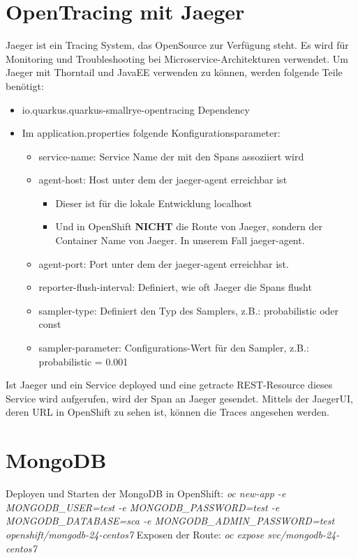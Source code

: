 \documentclass[11pt, a4paper, twoside]{article}   	%
\begin{document}
\section{OpenTracing mit Jaeger}
Jaeger ist ein Tracing System, das OpenSource zur Verfügung steht. Es wird für Monitoring und Troubleshooting bei Microservice-Architekturen verwendet.
Um Jaeger mit Thorntail und JavaEE verwenden zu können, werden folgende Teile benötigt:
\begin{itemize}
	\item io.quarkus.quarkus-smallrye-opentracing  Dependency
	\item Im application.properties folgende Konfigurationsparameter:
	\begin{itemize}
		\item service-name: Service Name der mit den Spans assoziiert wird
		\item agent-host: Host unter dem der jaeger-agent erreichbar ist
		\begin{itemize}
			\item Dieser ist für die lokale Entwicklung localhost
			\item Und in OpenShift \textbf{NICHT} die Route von Jaeger, sondern der Container Name von Jaeger. In unserem Fall jaeger-agent.
		\end{itemize}
		\item agent-port: Port unter dem der jaeger-agent erreichbar ist.
		\item reporter-flush-interval: Definiert, wie oft Jaeger die Spans flusht
		\item sampler-type: Definiert den Typ des Samplers, z.B.: probabilistic oder const
		\item sampler-parameter: Configurations-Wert für den Sampler, z.B.: probabilistic = 0.001
	\end{itemize}
\end{itemize} 

Ist Jaeger und ein Service deployed und eine getracte REST-Resource dieses Service wird aufgerufen, wird der Span an Jaeger gesendet. Mittels der JaegerUI, deren URL in OpenShift zu sehen ist, können die Traces angesehen werden.

\section{MongoDB}
Deployen und Starten der MongoDB in OpenShift: \newline
\textit{oc new-app -e MONGODB\_USER=test -e MONGODB\_PASSWORD=test -e MONGODB\_DATABASE=sca -e MONGODB\_ADMIN\_PASSWORD=test openshift/mongodb-24-centos7} \newline
Exposen der Route: \newline
\textit{oc expose svc/mongodb-24-centos7}
\end{document}
